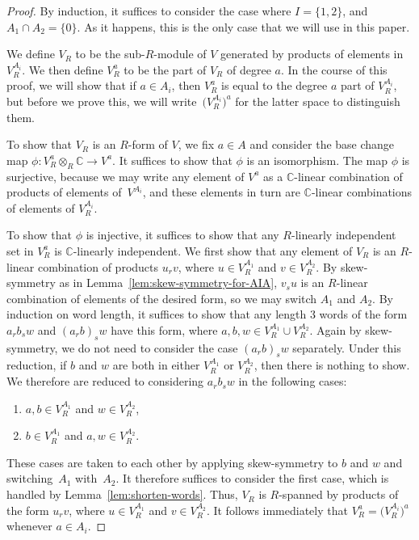 \documentclass[pdftex]{sigma}
\newcommand{\bC}{\mathbb{C}}
\theoremstyle{definition}
\begin{document}
\begin{proof}By induction, it suffices to consider the case where $I = \{1,2\}$, and $A_1 \cap A_2 = \{0\}$. As it happens, this is the only case that we will use in this paper.

We define $V_R$ to be the sub-$R$-module of $V$ generated by products of elements in $V^{A_i}_R$. We then define $V^a_R$ to be the part of $V_R$ of degree $a$. In the course of this proof, we will show that if $a \in A_i$, then $V^a_R$ is equal to the degree $a$ part of $V^{A_i}_R$, but before we prove this, we will write~$\big(V^{A_i}_R\big)^a$ for the latter space to distinguish them.

To show that $V_R$ is an $R$-form of $V$, we fix $a \in A$ and consider the base change map $\phi\colon V^a_R \otimes_{R} \bC \to V^a$. It suffices to show that $\phi$ is an isomorphism. The map $\phi$ is surjective, because we may write any element of $V^a$ as a $\bC$-linear combination of products of elements of~$V^{A_i}$, and these elements in turn are $\bC$-linear combinations of elements of $V^{A_i}_R$.

To show that $\phi$ is injective, it suffices to show that any $R$-linearly independent set in $V^a_R$ is $\bC$-linearly independent. We first show that any element of $V_R$ is an $R$-linear combination of products $u_r v$, where $u \in V^{A_1}_R$ and $v \in V^{A_2}_R$. By skew-symmetry as in Lemma~\ref{lem:skew-symmetry-for-AIA}, $v_s u$ is an $R$-linear combination of elements of the desired form, so we may switch $A_1$ and $A_2$. By induction on word length, it suffices to show that any length 3 words of the form $a_r b_s w$ and $(a_r b)_s w$ have this form, where $a,b,w \in V^{A_1}_R \cup V^{A_2}_R$. Again by skew-symmetry, we do not need to consider the case $(a_r b)_s w$ separately. Under this reduction, if $b$ and $w$ are both in either $V^{A_1}_R$ or $V^{A_2}_R$, then there is nothing to show. We therefore are reduced to considering $a_r b_s w$ in the following cases:
\begin{enumerate}\itemsep=0pt
\item[1)] $a,b \in V^{A_1}_R$ and $w \in V^{A_2}_R$,
\item[2)] $b \in V^{A_1}_R$ and $a, w \in V^{A_2}_R$.
\end{enumerate}
These cases are taken to each other by applying skew-symmetry to $b$ and $w$ and swit\-ching~$A_1$ with~$A_2$. It therefore suffices to consider the first case, which is handled by Lemma~\ref{lem:shorten-words}. Thus, $V_R$ is $R$-spanned by products of the form $u_r v$, where $u \in V^{A_1}_R$ and $v \in V^{A_2}_R$. It follows immediately that $V^a_R = \big(V^{A_i}_R\big)^a$ whenever $a \in A_i$.


\end{proof}
\end{document}
